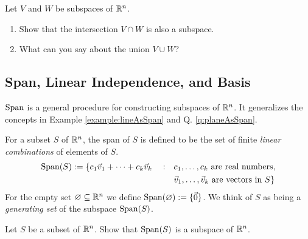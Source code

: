 \begin{qbox}
  Let $V$ and $W$ be subspaces of $\mathbb{R}^n$.
  \begin{enumerate}
    \item Show that the intersection $V \cap W$ is also a subspace.
    \item What can you say about the union $V \cup W$?
  \end{enumerate}
\end{qbox}














\subsection{Span, Linear Independence, and Basis}
$\operatorname{Span}$ is a general procedure for constructing subspaces of $\mathbb{R}^n$. It generalizes the concepts in Example \ref{example:lineAsSpan} and Q. \ref{q:planeAsSpan}.

\begin{definition}
  For a subset $S$ of  $\mathbb{R}^n$, the span of $S$ is defined to be the set of finite \emph{linear combinations} of elements of $S$.
  \begin{align*}
    \operatorname{Span}(S) := \{ c_1 \vec{v}_1 + \dots + c_k \vec{v}_k \quad : \quad
    & c_1, \dots, c_k \mbox{ are real numbers}, \\
    & \vec{v}_1, \dots, \vec{v}_k \mbox{ are vectors in } S \}
  \end{align*}
  For the empty set $ \varnothing \subseteq \mathbb{R}^n$ we define $\operatorname{Span}(\varnothing):=\{\vec{0}\}$.
  We think of $S$ as being a \emph{generating set} of the subspace $\operatorname{Span}(S)$.
\end{definition}

\begin{qbox}
  Let $S$ be a subset of $\mathbb{R}^n$. Show that $\operatorname{Span}(S)$ is a subspace of $\mathbb{R}^n$.
\end{qbox}

